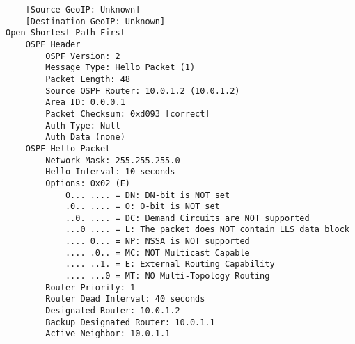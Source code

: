 \begin{lstlisting}
    [Source GeoIP: Unknown]
    [Destination GeoIP: Unknown]
Open Shortest Path First
    OSPF Header
        OSPF Version: 2
        Message Type: Hello Packet (1)
        Packet Length: 48
        Source OSPF Router: 10.0.1.2 (10.0.1.2)
        Area ID: 0.0.0.1
        Packet Checksum: 0xd093 [correct]
        Auth Type: Null
        Auth Data (none)
    OSPF Hello Packet
        Network Mask: 255.255.255.0
        Hello Interval: 10 seconds
        Options: 0x02 (E)
            0... .... = DN: DN-bit is NOT set
            .0.. .... = O: O-bit is NOT set
            ..0. .... = DC: Demand Circuits are NOT supported
            ...0 .... = L: The packet does NOT contain LLS data block
            .... 0... = NP: NSSA is NOT supported
            .... .0.. = MC: NOT Multicast Capable
            .... ..1. = E: External Routing Capability
            .... ...0 = MT: NO Multi-Topology Routing
        Router Priority: 1
        Router Dead Interval: 40 seconds
        Designated Router: 10.0.1.2
        Backup Designated Router: 10.0.1.1
        Active Neighbor: 10.0.1.1
\end{lstlisting}

